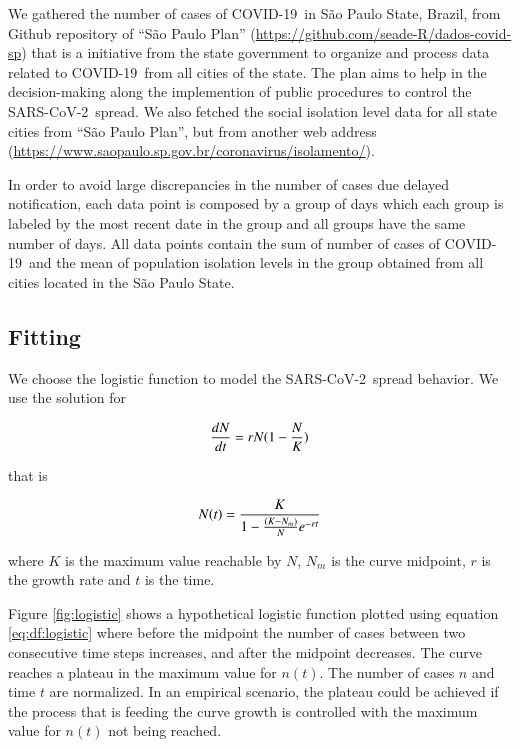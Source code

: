 \documentclass[review]{elsarticle}
\def\covid{\hbox{COVID-19}} %
\def\sarscov{\hbox{SARS-CoV-2}}
\begin{document}
We gathered the number of cases of \covid\ 
in S\~{a}o Paulo State, Brazil, 
from Github repository of ``S\~{a}o Paulo Plan'' 
(\url{https://github.com/seade-R/dados-covid-sp}) 
that is a initiative from the state government 
to organize and process data related to \covid \
from all cities of the state. 
The plan aims to help in the decision-making 
along the implemention of public 
procedures to control the \sarscov\ spread. 
We also fetched the social isolation level data 
for all state cities  from 
``S\~{a}o Paulo Plan'', but from another web address 
(\url{https://www.saopaulo.sp.gov.br/coronavirus/isolamento/}).

In order to avoid large discrepancies 
in the number of cases due delayed notification, 
 each data point is composed by a group of days 
 which each group is labeled by the most 
 recent date in the group and 
 all groups have the same number of days. 
 All data points contain the sum of number 
 of cases of \covid\ and 
 the mean of population isolation levels 
 in the group obtained from all cities 
 located in the S\~{a}o Paulo State.

\subsection{Fitting}

We choose the logistic function to model 
the \sarscov\ spread behavior. We use the 
solution for

\begin{equation}
{dN \over dt} = r N (1 - {N \over K})
\label{eq:df:logistic}
\end{equation}

\noindent that is

\begin{equation}
N(t) = {K \over {1- {(K-N_{m}) \over N} e^{-rt}}}
\label{eq:exp:logistic}
\end{equation}

\noindent where $K$ is the maximum value reachable by $N$, 
$N_m$ is the curve midpoint, 
$r$ is the growth rate 
and $t$ is the time.

Figure \ref{fig:logistic} shows a hypothetical logistic function 
plotted using equation \ref{eq:df:logistic} where before the midpoint 
the number of cases between 
two consecutive time steps increases, 
and after the midpoint decreases. 
The curve reaches a plateau in the maximum value for $n(t)$. 
The number of cases $n$ and time $t$ are normalized.
In an empirical scenario, the plateau could be achieved 
if the process that is feeding the curve 
growth is controlled with the maximum 
value for $n(t)$ not being reached.
\end{document}
